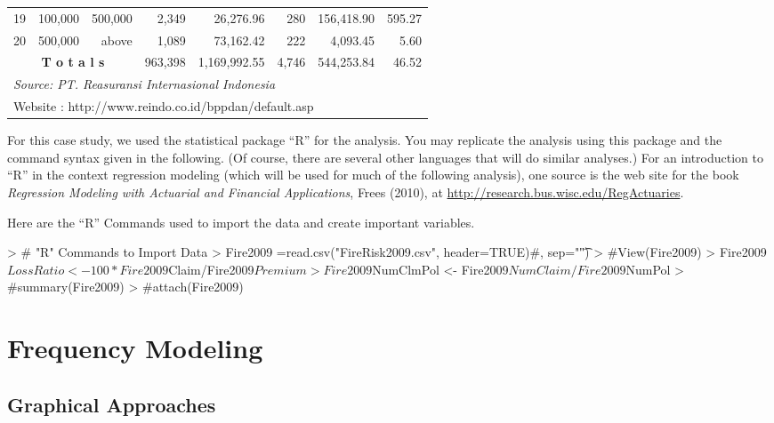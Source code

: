 \documentclass[12pt,letterpaper]{article}
\begin{document}
\begin{table}[h]
\begin{center}
\begin{tabular}{rrrrrrrr}
        19 &    100,000 &    500,000 &     2,349 & 26,276.96 &       280 & 156,418.90 &    595.27 \\
        20 &    500,000 &      above &     1,089 & 73,162.42 &       222 &  4,093.45 &      5.60 \\
\hline
   \multicolumn{ 3}{c}{{\bf T o t a l s}} & {963,398} & {1,169,992.55} & {4,746} & {544,253.84} & {46.52} \\
\hline
\multicolumn{8}{l}{{\it Source: PT. Reasuransi Internasional Indonesia}} \\
\multicolumn{8}{l}{{Website : http://www.reindo.co.id/bppdan/default.asp}} \\
\hline
\end{tabular}\end{center}
\end{table}


For this case study, we used the statistical package ``R'' for the analysis. 
You may replicate the analysis using this package and the command syntax given in the following. 
(Of course, there are several other languages that will do similar analyses.)
For an introduction to ``R'' in the context regression modeling (which will be used for much of the 
following analysis), one source is the web site for the book 
\textit{Regression Modeling with Actuarial and Financial Applications}, Frees (2010), at
\url{http://research.bus.wisc.edu/RegActuaries}.

Here are the ``R'' Commands used to import the data and create important variables.

\begin{Schunk}
\begin{Sinput}
> #  "R" Commands to Import Data
> Fire2009 =read.csv("FireRisk2009.csv", header=TRUE)#, sep="\t")
> #View(Fire2009)
> Fire2009$LossRatio <- 100*Fire2009$Claim/Fire2009$Premium
> Fire2009$NumClmPol <- Fire2009$NumClaim/Fire2009$NumPol
> #summary(Fire2009)
> #attach(Fire2009)
\end{Sinput}
\end{Schunk}

\newpage
\section{Frequency Modeling}

\subsection{Graphical Approaches}
\end{document}
